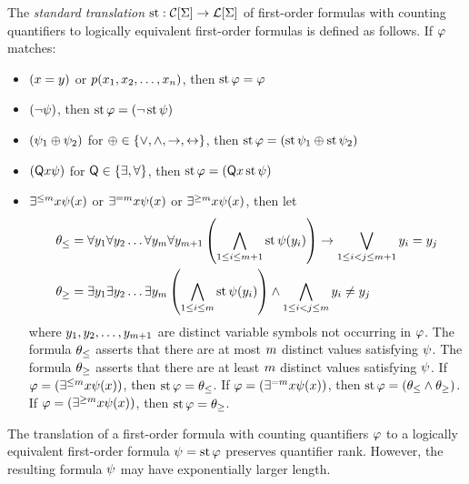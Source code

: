 
The \emph{standard translation} $\operatorname{st} : \mathcal{C}[\mathrm{\Sigma}] \to \mathcal{L}[\mathrm{\Sigma}]$ of
first-order formulas with counting quantifiers to logically equivalent
first-order formulas is defined as follows. If $\varphi$ matches:
\begin{itemize}
  \item $(x = y)$ or $p(x_{1}, x_{2}, \dots, x_{n})$, then
  $\operatorname{st}\varphi = \varphi$
  \item $(\lnot\psi)$, then $\operatorname{st}\varphi = (\lnot\operatorname{st}\psi)$
  \item $(\psi_1 \oplus \psi_2)$ for $\oplus \in \left\{\lor,\land,\rightarrow,\leftrightarrow\right\}$, then
  $\operatorname{st}\varphi = (\operatorname{st}\psi_1 \oplus \operatorname{st}\psi_2)$
  \item $(\mathsf{Q}x \psi)$ for $\mathsf{Q} \in \left\{\exists, \forall\right\}$, then
  $\operatorname{st}\varphi = (\mathsf{Q}x \operatorname{st}\psi)$
  \item $\exists^{\leq m}x \psi(x)$ or $\exists^{=m}x \psi(x)$ or
  $\exists^{\geq m}x \psi(x)$, then let
  \begin{align*}
  \theta_\leq &= \forall y_{1} \forall y_{2} \dots \forall y_{m}
  \forall y_{m+1}
  \left(\bigwedge_{1 \leq i \leq m+1} \operatorname{st}\psi(y_{i})\right) \rightarrow
  \bigvee_{1 \leq i < j \leq m+1} y_{i} = y_{j} \\
  \theta_\geq &= \exists y_{1} \exists y_{2} \dots \exists y_{m}
  \left(\bigwedge_{1 \leq i \leq m} \operatorname{st}\psi(y_{i})\right) \land
  \bigwedge_{1 \leq i < j \leq m} y_{i} \neq y_{j}
  \end{align*}
  where $y_{1}, y_{2}, \dots, y_{m+1}$ are distinct variable symbols not
  occurring in $\varphi$. The formula $\theta_\leq$ asserts that there are at most
  $m$ distinct values satisfying $\psi$. The formula $\theta_\geq$ asserts
  that there are at least $m$ distinct values satisfying $\psi$.
  If $\varphi = (\exists^{\leq m}x \psi(x))$, then
  $\operatorname{st}\varphi = \theta_\leq$.
  If $\varphi = (\exists^{=m}x \psi(x))$, then
  $\operatorname{st}\varphi = (\theta_\leq \land \theta_\geq)$.
  If $\varphi = (\exists^{\geq m}x \psi(x))$, then
  $\operatorname{st}\varphi = \theta_\geq$.
\end{itemize}

\begin{remark}\label{rem:sttr-exp-size}
The translation of a first-order formula with counting quantifiers $\varphi$ to a
logically equivalent first-order formula $\psi = \operatorname{st}\varphi$ preserves
quantifier rank. However, the resulting formula $\psi$ may have exponentially
larger length.
\end{remark}